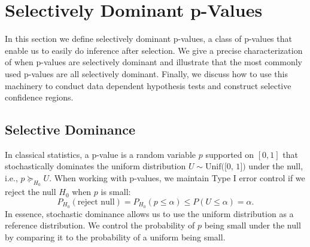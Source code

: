 \documentclass{article}
\begin{document}



\section{Selectively Dominant p-Values}
\label{sec:dominance}

In this section we define selectively dominant p-values, a class of p-values that enable us to easily do inference after selection. We give a precise characterization of when p-values are selectively dominant and illustrate that the most commonly used p-values are all selectively dominant. Finally, we discuss how to use this machinery to conduct data dependent hypothesis tests and construct selective confidence regions. 

\subsection{Selective Dominance}

In classical statistics, a p-value is a random variable $p$ supported on $[0, 1]$ that stochastically dominates the uniform distribution $U \sim \text{Unif([0, 1])}$ under the null, i.e., $p \succeq_{H_0} U$. When working with p-values, we maintain Type I error control if we reject the null $H_0$ when $p$ is small:
\begin{equation*}
    P_{H_0}(\text{reject null}) = P_{H_0}(p \leq \alpha) \leq P(U \leq \alpha)  = \alpha.
\end{equation*}
In essence, stochastic dominance allows us to use the uniform distribution as a reference distribution. We control the probability of $p$ being small under the null by comparing it to the probability of a uniform being small. 
\end{document}
